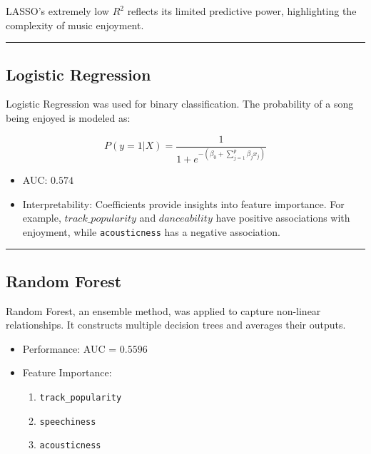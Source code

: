 \documentclass[11pt]{article}
\providecommand{\tightlist}{%
  \setlength{\itemsep}{0pt}\setlength{\parskip}{0pt}}
\begin{document}
LASSO's extremely low \(R^2\) reflects its limited predictive power,
highlighting the complexity of music enjoyment.

\begin{center}\rule{0.5\linewidth}{0.5pt}\end{center}

\subsection{Logistic Regression}\label{logistic-regression}

Logistic Regression was used for binary classification. The probability
of a song being enjoyed is modeled as:

\[
P(y = 1 | X) = \frac{1}{1 + e^{-\left(\beta_0 + \sum_{j=1}^p \beta_j x_j\right)}}
\]

\begin{itemize}
\tightlist
\item
  AUC: \(0.574\)\\
\item
  Interpretability: Coefficients provide insights into feature
  importance. For example, \(track\_popularity\) and \(danceability\)
  have positive associations with enjoyment, while \texttt{acousticness}
  has a negative association.
\end{itemize}

\begin{center}\rule{0.5\linewidth}{0.5pt}\end{center}

\subsection{Random Forest}\label{random-forest}

Random Forest, an ensemble method, was applied to capture non-linear
relationships. It constructs multiple decision trees and averages their
outputs.

\begin{itemize}
\tightlist
\item
  Performance: AUC = \(0.5596\)\\
\item
  Feature Importance:

  \begin{enumerate}
  \def\labelenumi{\arabic{enumi}.}
  \tightlist
  \item
    \texttt{track\_popularity}
  \item
    \texttt{speechiness}
  \item
    \texttt{acousticness}
  \end{enumerate}
\end{itemize}
\end{document}
